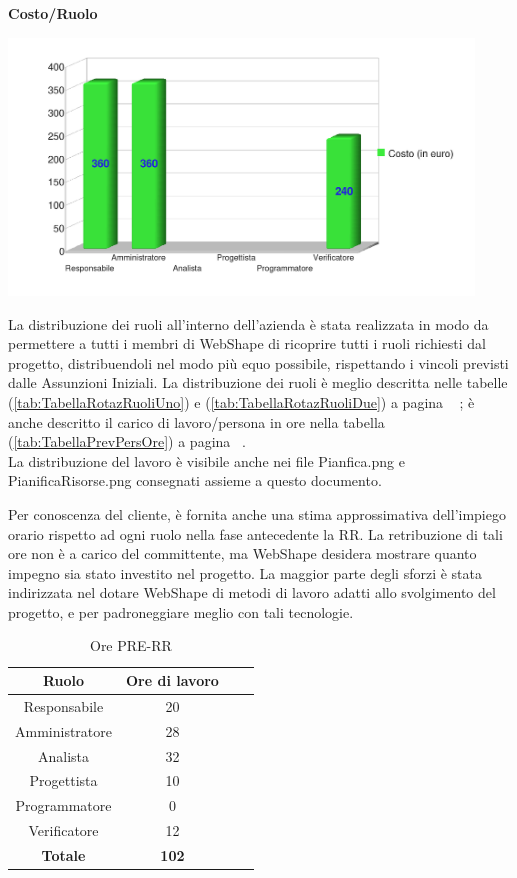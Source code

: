 \begin{center}\textbf{Costo/Ruolo}
\end{center}
\includegraphics[width=350pt]{RQ-RA_Costi}

La distribuzione dei ruoli all'interno dell'azienda \`e stata realizzata in modo da permettere a tutti i membri di WebShape di ricoprire tutti i ruoli richiesti dal progetto, distribuendoli nel modo pi\`u equo possibile, rispettando i vincoli previsti dalle Assunzioni Iniziali. La distribuzione dei ruoli \`e meglio descritta nelle tabelle (\ref{tab:TabellaRotazRuoliUno}) e (\ref{tab:TabellaRotazRuoliDue}) a pagina ~\pageref{tab:TabellaRotazRuoliUno} ; \`e anche descritto il carico di lavoro/persona in ore nella tabella (\ref{tab:TabellaPrevPersOre}) a pagina ~\pageref{tab:TabellaPrevPersOre}.\\
La distribuzione del lavoro \`e visibile anche nei file Pianfica.png e PianificaRisorse.png consegnati assieme a questo documento.

Per conoscenza del cliente, \`e fornita anche una stima approssimativa dell'impiego orario rispetto ad ogni ruolo nella fase antecedente la RR. La retribuzione di tali ore non \`e a carico del committente, ma WebShape desidera mostrare quanto impegno sia stato investito nel progetto. La maggior parte degli sforzi \`e stata indirizzata nel dotare WebShape di metodi di lavoro adatti allo svolgimento del progetto, e per padroneggiare meglio con tali tecnologie.\\

\begin{table}[h]
	\begin{center}
		  \begin{tabular}{|c|c|c|c|}
		 \hline 
		 \textbf{Ruolo} & \textbf{Ore di lavoro} \\
		 \hline
		Responsabile & 20 \\
		Amministratore & 28 \\
		Analista & 32 \\
		Progettista & 10 \\
		Programmatore & 0 \\
		Verificatore & 12 \\
        \hline
        \textbf{Totale} & \textbf{102} \\
		\hline
		\end{tabular}
	\caption{Ore PRE-RR} 
	\label{tab:tabella_PRE_RR}
	\end{center}	
\end{table}

